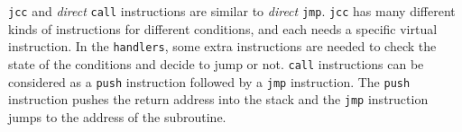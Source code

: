 \begin{table}[!ht]
\renewcommand{\arraystretch}{1.0}
\tbl{The Virtual Instructions and Handlers of \texttt{jmp} Instructions.\label{tab:jmp}}{ %
\begin{tabular}{|c|l|}
\hline
VI                           & Handler      \\ \hline \hline %
\texttt{jmp\underline{ }di}  & \emph{;operand: addr of the dest. bytecode instr.}        \\
                             & \texttt{pop eax} \emph{;get operand}                \\
                             & \texttt{mov VPC, eax}                                                \\ \hline
\texttt{jmp\underline{ }do}  & \emph{;operand: addr of the dest. native instr.}          \\
                             & \texttt{pop [mem]} \emph{;get operand}               \\
                             & \texttt{...} \emph{;restore native context}                         \\
                             & \texttt{jmp dword [mem]}                                             \\ \hline
\end{tabular}}
\begin{tabnote}
\end{tabnote}
\end{table}

\texttt{jcc} and \textit{direct} \texttt{call} instructions are similar to \textit{direct} \texttt{jmp}. \texttt{jcc} has many different kinds of instructions for different conditions, and each needs a specific virtual instruction. In the \texttt{handlers}, some extra instructions are needed to check the state of the conditions and decide to jump or not. \texttt{call} instructions can be considered as a \texttt{push} instruction followed by a \texttt{jmp} instruction. The \texttt{push} instruction pushes the return address into the stack and the \texttt{jmp} instruction jumps to the address of the subroutine.


